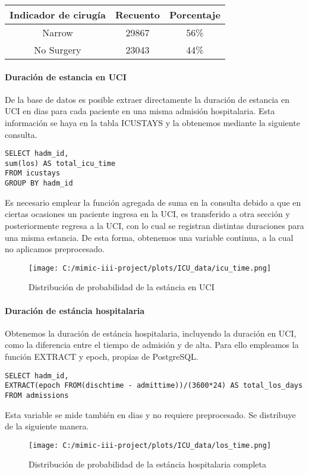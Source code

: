 \documentclass{report}
\begin{document}
\begin{longtable}[]{@{}ccc@{}}
\toprule
Indicador de cirugía & Recuento & Porcentaje\tabularnewline
\midrule
\endhead
Narrow & 29867 & 56\%\tabularnewline
No Surgery & 23043 & 44\%\tabularnewline
\bottomrule
\end{longtable}
\newpage
\paragraph{Duración de estancia en UCI}
De la base de datos es posible extraer directamente la duración de
estancia en UCI en dias para cada paciente en una misma admisión
hospitalaria. Esta información se haya en la tabla ICUSTAYS y la
obtenemos mediante la siguiente consulta.

\begin{verbatim}
SELECT hadm_id, 
sum(los) AS total_icu_time 
FROM icustays
GROUP BY hadm_id
\end{verbatim}

Es necesario emplear la función agregada de suma en la consulta debido a
que en ciertas ocasiones un paciente ingresa en la UCI, es transferido a
otra sección y posteriormente regresa a la UCI, con lo cual se registran
distintas duraciones para una misma estancia. De esta forma, obtenemos
una variable continua, a la cual no aplicamos preprocesado.


\begin{figure}[h]
\centering
\texttt{[image: C:/mimic-iii-project/plots/ICU\_data/icu\_time.png]}
\caption{Distribución de probabilidad de la estáncia en UCI}
\end{figure}
\newpage

\paragraph{Duración de estáncia hospitalaria}

Obtenemos la duración de estáncia hospitalaria, incluyendo la duración
en UCI, como la diferencia entre el tiempo de admisión y de alta. Para
ello empleamos la función EXTRACT y epoch, propias de PostgreSQL.

\begin{verbatim}
SELECT hadm_id, 
EXTRACT(epoch FROM(dischtime - admittime))/(3600*24) AS total_los_days
FROM admissions
\end{verbatim}
Esta variable se mide también en dias y no requiere preprocesado. Se distribuye de la siguiente manera.

\begin{figure}[h]
\centering
\texttt{[image: C:/mimic-iii-project/plots/ICU\_data/los\_time.png]}
\caption{Distribución de probabilidad de la estáncia hospitalaria completa}
\end{figure}
\end{document}
